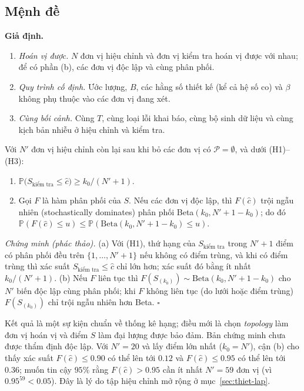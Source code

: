 \subsection{Mệnh đề}
\textbf{Giả định.}
\begin{enumerate}
  \item[(H1)] \emph{Hoán vị được.} $N$ đơn vị hiệu chỉnh và đơn vị kiểm tra hoán vị được với nhau; để có phần (b), các đơn vị độc lập và cùng phân phối.
  \item[(H2)] \emph{Quy trình cố định.} Ước lượng, $B$, các hằng số thiết kế (kể cả hệ số co) và $\beta$ không phụ thuộc vào các đơn vị đang xét.
  \item[(H3)] \emph{Cùng bối cảnh.} Cùng $T$, cùng loại lỗi khai báo, cùng bộ sinh dữ liệu và cùng kịch bản nhiễu ở hiệu chỉnh và kiểm tra.
\end{enumerate}

\begin{menhde}\label{prop:rank}
Với $N'$ đơn vị hiệu chỉnh còn lại sau khi bỏ các đơn vị có $\mathcal P=\emptyset$, và dưới (H1)--(H3):
\begin{enumerate}
  \item[(a)] $\mathbb P\bigl(S_{\text{kiểm tra}}\le\hat c\bigr)\ge k_0/(N'+1)$.
  \item[(b)] Gọi $F$ là hàm phân phối của $S$. Nếu các đơn vị độc lập, thì $F(\hat c)$ trội ngẫu nhiên (stochastically dominates) phân phối Beta$(k_0,N'+1-k_0)$; do đó $\mathbb P(F(\hat c)\le u)\le\mathbb P(\mathrm{Beta}(k_0,N'+1-k_0)\le u)$.
\end{enumerate}
\end{menhde}

\emph{Chứng minh (phác thảo).} (a) Với (H1), thứ hạng của $S_{\text{kiểm tra}}$ trong $N'+1$ điểm có phân phối đều trên $\{1,\dots,N'+1\}$ nếu không có điểm trùng, và khi có điểm trùng thì xác suất $S_{\text{kiểm tra}}\le\hat c$ chỉ lớn hơn; xác suất đó bằng ít nhất $k_0/(N'+1)$. (b) Nếu $F$ liên tục thì $F(S_{(k_0)})\sim\mathrm{Beta}(k_0,N'+1-k_0)$ cho $N'$ biến độc lập cùng phân phối; khi $F$ không liên tục (do lưới hoặc điểm trùng) $F(S_{(k_0)})$ chỉ trội ngẫu nhiên hơn Beta. $\square$

\begin{nhanxet}
Kết quả là một sự kiện chuẩn về thống kê hạng; điều mới là chọn \emph{topology} làm đơn vị hoán vị và điểm $S$ làm đại lượng được bảo đảm. Bản chứng minh chưa được thẩm định độc lập. Với $N'=20$ và lấy điểm lớn nhất ($k_0=N'$), cận (b) cho thấy xác suất $F(\hat c)\le0.90$ có thể lên tới $0.12$ và $F(\hat c)\le0.95$ có thể lên tới $0.36$; muốn tin cậy $95\%$ rằng $F(\hat c)>0.95$ cần ít nhất $N'=59$ đơn vị (vì $0.95^{59}<0.05$). Đây là lý do tập hiệu chỉnh mở rộng ở mục~\ref{sec:thiet-lap}.
\end{nhanxet}

